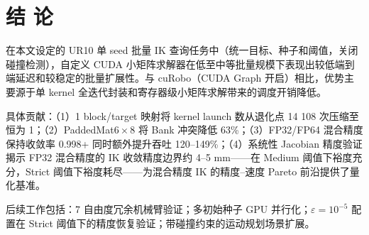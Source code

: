 \documentclass[twocolumn,a4paper,10pt]{ctexart}
\begin{document}
\section{结 论}

在本文设定的 UR10 单 seed 批量 IK 查询任务中（统一目标、种子和阈值，关闭碰撞检测），自定义 CUDA 小矩阵求解器在低至中等批量规模下表现出较低端到端延迟和较稳定的批量扩展性。与 cuRobo（CUDA Graph 开启）相比，优势主要源于单 kernel 全迭代封装和寄存器级小矩阵求解带来的调度开销降低。

具体贡献：（1）1 block/target 映射将 kernel launch 数从退化点 14 108 次压缩至恒为 1；（2）PaddedMat$6\times8$ 将 Bank 冲突降低 63\%；（3）FP32/FP64 混合精度保持收敛率 0.998+ 同时额外提升吞吐 120--149\%；（4）系统性 Jacobian 精度验证揭示 FP32 混合精度的 IK 收敛精度边界约 4--5 mm——在 Medium 阈值下裕度充分，Strict 阈值下裕度耗尽——为混合精度 IK 的精度--速度 Pareto 前沿提供了量化基准。

后续工作包括：7 自由度冗余机械臂验证；多初始种子 GPU 并行化；$\varepsilon=10^{-5}$ 配置在 Strict 阈值下的精度恢复验证；带碰撞约束的运动规划场景扩展。
\end{document}
